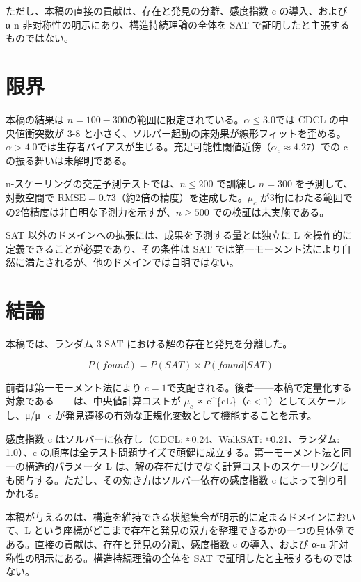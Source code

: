 \documentclass[12pt,a4paper]{article}
\begin{document}
ただし、本稿の直接の貢献は、存在と発見の分離、感度指数 c の導入、および α-n 非対称性の明示にあり、構造持続理論の全体を SAT で証明したと主張するものではない。

\section{限界}\label{ux9650ux754c}

本稿の結果は \(n = 100-300\)の範囲に限定されている。\(\alpha \le 3.0\)では CDCL の中央値衝突数が 3-8 と小さく、ソルバー起動の床効果が線形フィットを歪める。\(\alpha > 4.0\)では生存者バイアスが生じる。充足可能性閾値近傍（\(\alpha_{c} ≈ 4.27\)）での c の振る舞いは未解明である。

n-スケーリングの交差予測テストでは、\(n \le 200\) で訓練し \(n = 300\) を予測して、対数空間で \(\text{RMSE} = 0.73\)（約2倍の精度）を達成した。\(\mu_c\) が3桁にわたる範囲での2倍精度は非自明な予測力を示すが、\(n \ge 500\) での検証は未実施である。

SAT 以外のドメインへの拡張には、成果を予測する量とは独立に L を操作的に定義できることが必要であり、その条件は SAT では第一モーメント法により自然に満たされるが、他のドメインでは自明ではない。

\section{結論}\label{ux7d50ux8ad6}

本稿では、ランダム 3-SAT における解の存在と発見を分離した。

\[
P(found) = P(SAT) \times P(found|SAT)
\]

前者は第一モーメント法により \(c = 1\)で支配される。後者------本稿で定量化する対象である------は、中央値計算コストが \(\mu_{c}\) ∝ e\^{}\{cL\}（\(c < 1\)）としてスケールし、μ/μ\_c が発見遷移の有効な正規化変数として機能することを示す。

感度指数 c はソルバーに依存し（CDCL: ≈0.24、WalkSAT: ≈0.21、ランダム: 1.0）、c の順序は全テスト問題サイズで頑健に成立する。第一モーメント法と同一の構造的パラメータ L は、解の存在だけでなく計算コストのスケーリングにも関与する。ただし、その効き方はソルバー依存の感度指数 c によって割り引かれる。

本稿が与えるのは、構造を維持できる状態集合が明示的に定まるドメインにおいて、L という座標がどこまで存在と発見の双方を整理できるかの一つの具体例である。直接の貢献は、存在と発見の分離、感度指数 c の導入、および α-n 非対称性の明示にある。構造持続理論の全体を SAT で証明したと主張するものではない。
\end{document}
